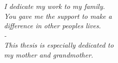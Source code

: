 \null{}
\begin{flushright}
{\it{
I dedicate my work to my family. \\
You gave me the support to make a \\
difference in other peoples lives. \\
- \\
This thesis is especially dedicated to \\
my mother and grandmother.\\

}}
\end{flushright}
\null
\newpage